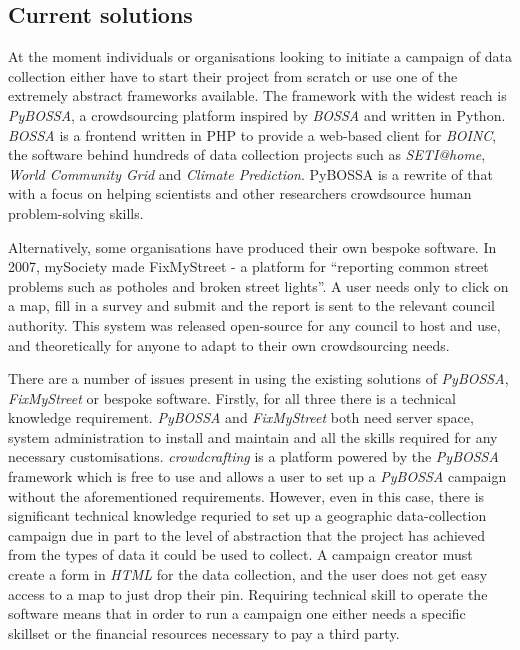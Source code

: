 \documentclass{article}
\begin{document}
		\subsection{Current solutions}
		At the moment individuals or organisations looking to initiate a campaign of data collection either have to start their project from scratch or use one of the extremely abstract frameworks available.
		The framework with the widest reach is \textit{PyBOSSA}, a crowdsourcing platform inspired by \textit{BOSSA} and written in Python. \textit{BOSSA} is a frontend written in PHP to provide a web-based client for \textit{BOINC}, the software behind hundreds of data collection projects such as \textit{SETI@home}, \textit{World Community Grid} and \textit{Climate Prediction}\cite{boincstats}.
		PyBOSSA is a rewrite of that with a focus on helping scientists and other researchers crowdsource human problem-solving skills.

		Alternatively, some organisations have produced their own bespoke software. In 2007, mySociety made FixMyStreet - a platform for ``reporting common street problems such as potholes and broken street lights''\cite{fixmystreet}.
		A user needs only to click on a map, fill in a survey and submit and the report is sent to the relevant council authority.
		This system was released open-source for any council to host and use, and theoretically for anyone to adapt to their own crowdsourcing needs.

		There are a number of issues present in using the existing solutions of \textit{PyBOSSA}, \textit{FixMyStreet} or bespoke software. Firstly, for all three there is a technical knowledge requirement. \textit{PyBOSSA} and \textit{FixMyStreet} both need server space, system administration to install and maintain and all the skills required for any necessary customisations.
		\textit{crowdcrafting} is a platform powered by the \textit{PyBOSSA} framework which is free to use and allows a user to set up a \textit{PyBOSSA} campaign without the aforementioned requirements.
		However, even in this case, there is significant technical knowledge requried to set up a geographic data-collection campaign due in part to the level of abstraction that the project has achieved from the types of data it could be used to collect.
		A campaign creator must create a form in \textit{HTML} for the data collection, and the user does not get easy access to a map to just drop their pin. Requiring technical skill to operate the software means that in order to run a campaign one either needs a specific skillset or the financial resources necessary to pay a third party.
\end{document}
